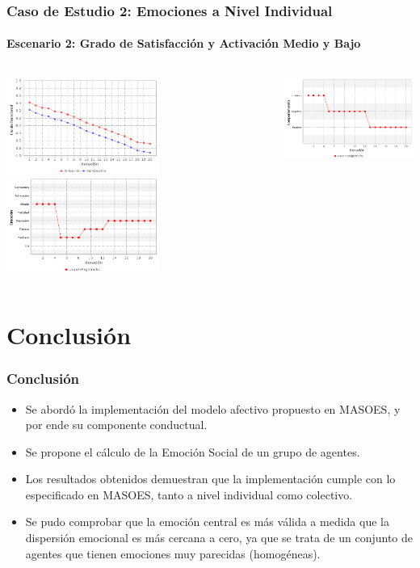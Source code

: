 \documentclass{beamer}
\begin{document}
\begin{frame}
\frametitle{Caso de Estudio 2: Emociones a Nivel Individual}
\framesubtitle{Escenario 2: Grado de Satisfacción y Activación Medio y Bajo}
\begin{columns}
\tiny
\centering
\includegraphics[width=5cm]{ilustraciones/caso2escenerio2-estado-emocional-colaborador1}
\tiny
\centering
\includegraphics[width=5cm]{ilustraciones/caso2escenerio2-modificacion-de-emociones}

\includegraphics[width=5cm]{ilustraciones/caso2escenerio2-modificacion-de-comportamiento}
\end{columns}
\end{frame}


\section{Conclusión}
\begin{frame}
\frametitle{Conclusión}
\begin{itemize}
  \item Se abordó la implementación del modelo afectivo
  propuesto en MASOES, y por ende su componente conductual.
	\item Se propone el cálculo de
  la Emoción Social de un grupo de agentes.
  \item Los resultados obtenidos demuestran que la implementación cumple
  con lo especificado en MASOES, tanto a nivel individual como colectivo.
  \item Se pudo comprobar que la emoción central es más válida a medida que la dispersión
  emocional es más cercana a cero, ya que se trata de un conjunto de agentes que tienen emociones muy parecidas (homogéneas).
\end{itemize}
\end{frame}
\end{document}
